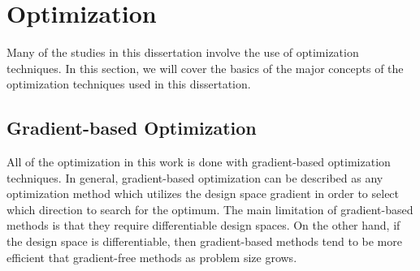 % 

\section{Optimization}

Many of the studies in this dissertation involve the use of optimization techniques.
%
In this section, we will cover the basics of the major concepts of the optimization techniques used in this dissertation.


\subsection{Gradient-based Optimization}

All of the optimization in this work is done with gradient-based optimization techniques.
%
In general, gradient-based optimization can be described as any optimization method which utilizes the design space gradient in order to select which direction to search for the optimum.
%
The main limitation of gradient-based methods is that they require differentiable design spaces.
%
On the other hand, if the design space is differentiable, then gradient-based methods tend to be more efficient that gradient-free methods as problem size grows.




